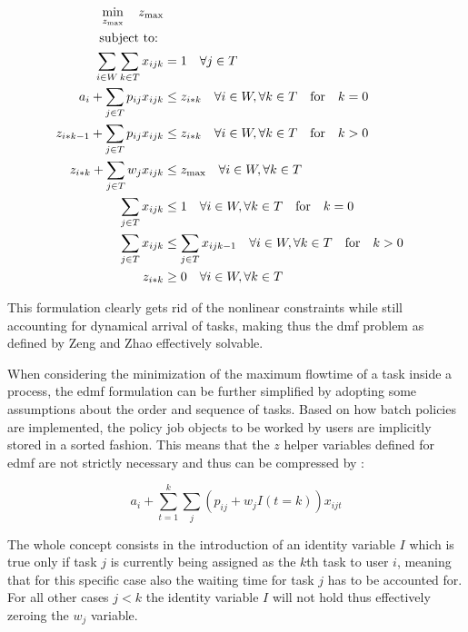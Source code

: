 \documentclass{seal_thesis}
\begin{document}
\begin{align}
    \min_{z_{\text{max}}} \quad z_{\text{max}}\\
    \text{subject to: } \notag \\
    \sum_{i \in W} \sum_{k \in T} x_{ijk} &= 1 \quad \forall j \in T\\
    a_i + \sum_{j \in T} p_{ij} x_{ijk} &\leq z_{i*k} \quad \forall i \in W, \forall k \in T \quad \text{for} \quad k=0\\
    z_{i*k-1} + \sum_{j \in T} p_{ij} x_{ijk} &\leq z_{i*k} \quad \forall i \in W, \forall k \in T \quad \text{for} \quad k>0\\
    z_{i*k}+ \sum_{j \in T} w_j x_{ijk} &\leq z_{\text{max}} \quad \forall i \in W, \forall k \in T\\
    \sum_{j \in T} x_{ijk} &\leq 1 \quad \forall i \in W, \forall k \in T \quad \text{for} \quad k=0\\
    \sum_{j \in T} x_{ijk} &\leq \sum_{j \in T} x_{ijk-1} \quad \forall i \in W, \forall k \in T \quad \text{for} \quad k>0\\
    z_{i*k} &\geq 0 \quad \forall i \in W, \forall k \in T
\end{align}

This formulation clearly gets rid of the nonlinear constraints while still accounting for dynamical arrival of tasks, making thus the \gls{dmf} problem as defined by Zeng and Zhao effectively solvable.

When considering the minimization of the maximum flowtime of a task inside a process, the \gls{edmf} formulation can be further simplified by adopting some assumptions about the order and sequence of tasks. Based on how batch policies are implemented, the policy job objects to be worked by users are implicitly stored in a sorted fashion. This means that the $z$ helper variables defined for \gls{edmf} are not strictly necessary and thus can be compressed by :

\begin{equation}
\label{eq:simplified_z_with_k}
	a_i + \sum_{t=1}^k \sum_j (p_{ij} + w_j I(t=k))x_{ijt}
\end{equation}

The whole concept consists in the introduction of an identity variable $I$ which is true only if task $j$ is currently being assigned as the $k$th task to user $i$, meaning that for this specific case also the waiting time for task $j$ has to be accounted for. For all other cases \ie $j<k$ the identity variable $I$ will not hold thus effectively zeroing the $w_j$ variable.
\end{document}
